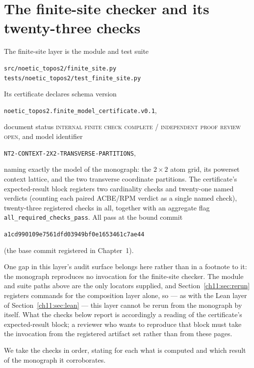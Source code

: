 \section{The finite-site checker and its twenty-three checks}
\label{ch11:sec:finitesite}

The finite-site layer is the module and test suite
\begin{center}
\texttt{src/noetic\_topos2/finite\_site.py}\\
\texttt{tests/noetic\_topos2/test\_finite\_site.py}
\end{center}
Its
certificate declares schema version
\begin{center}
\texttt{noetic\_topos2.finite\_model\_certificate.v0.1},
\end{center}
document status
\textsc{internal finite check complete / independent proof review open}, and
model identifier
\begin{center}
\texttt{NT2-CONTEXT-2X2-TRANSVERSE-PARTITIONS},
\end{center}
naming exactly the model of the monograph: the $2 \times 2$ atom grid, its
powerset context lattice, and the two transverse coordinate partitions. The
certificate's expected-result block registers two cardinality checks and
twenty-one named verdicts (counting each paired ACBE/RPM verdict as a single
named check), twenty-three registered checks in all, together with an
aggregate flag \texttt{all\_required\_checks\_pass}. All pass at the bound
commit
\begin{center}
\texttt{a1cd990109e7561dfd03949bf0e1653461c7ae44}
\end{center}
(the base commit registered in Chapter~1).

One gap in this layer's audit surface belongs here rather than in a footnote
to it: the monograph reproduces no invocation for the finite-site checker.
The module and suite paths above are the only locators supplied, and
Section~\ref{ch11:sec:rerun} registers commands for the composition layer
alone, so --- as with the Lean layer of Section~\ref{ch11:sec:lean} --- this
layer cannot be rerun from the monograph by itself. What the checks below
report is accordingly a reading of the certificate's expected-result block;
a reviewer who wants to reproduce that block must take the invocation from
the registered artifact set rather than from these pages.

We take the checks in order, stating
for each what is computed and which result of the monograph it
corroborates.

